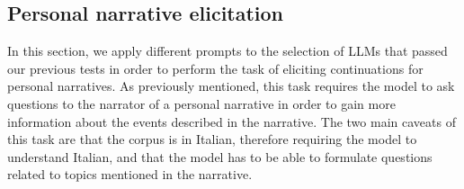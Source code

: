 
\subsection{Personal narrative elicitation}
\label{cha:methodology-personal-narrative-elicitation}
In this section, we apply different prompts to the selection of LLMs that passed our previous tests in order to perform the task of eliciting continuations for personal narratives.  As previously mentioned, this task requires the model to ask questions to the narrator of a personal narrative in order to gain more information about the events described in the narrative. The two main caveats of this task are that the corpus is in Italian, therefore requiring the model to understand Italian, and that the model has to be able to formulate questions related to topics mentioned in the narrative. 

